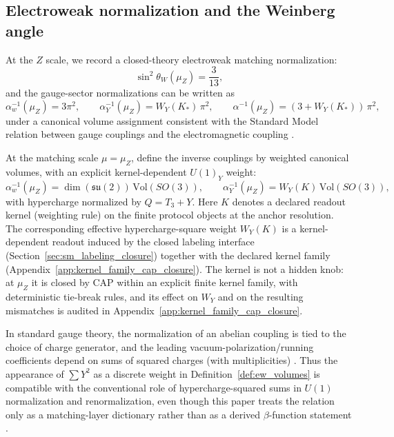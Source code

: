 \subsection{Electroweak normalization and the Weinberg angle}
\label{subsec:weinberg_angle}

At the $Z$ scale, we record a closed-theory electroweak matching normalization:
\begin{equation}\label{eq:weinberg_3_13}
\sin^2\theta_W(\mu_Z)=\frac{3}{13},
\end{equation}
and the gauge-sector normalizations can be written as
\begin{equation}\label{eq:ew_inverse_alphas}
\alpha_w^{-1}(\mu_Z)=3\pi^2,\qquad \alpha_Y^{-1}(\mu_Z)=W_Y(K_\ast)\,\pi^2,\qquad \alpha^{-1}(\mu_Z)=(3+W_Y(K_\ast))\,\pi^2,
\end{equation}
under a canonical volume assignment consistent with the Standard Model relation between gauge couplings and the electromagnetic coupling \cite{Glashow1961,Weinberg1967,Salam1968,PeskinSchroeder1995,PDGRPP2024}.
\begin{definition}\label{def:ew_volumes}
At the matching scale $\mu=\mu_Z$, define the inverse couplings by weighted canonical volumes, with an explicit kernel-dependent $U(1)_Y$ weight:
\[
\alpha_w^{-1}(\mu_Z)=\dim(\mathfrak{su}(2))\,\mathrm{Vol}(SO(3)),\qquad
\alpha_Y^{-1}(\mu_Z)=W_Y(K)\,\mathrm{Vol}(SO(3)),
\]
with hypercharge normalized by $Q=T_3+Y$.
\AuditTag Here $K$ denotes a declared readout kernel (weighting rule) on the finite protocol objects at the anchor resolution.
The corresponding effective hypercharge-square weight $W_Y(K)$ is a kernel-dependent readout induced by the closed labeling interface (Section~\ref{sec:sm_labeling_closure}) together with the declared kernel family (Appendix~\ref{app:kernel_family_cap_closure}).
\AuditTag The kernel is not a hidden knob: at $\mu_Z$ it is closed by CAP within an explicit finite kernel family, with deterministic tie-break rules, and its effect on $W_Y$ and on the resulting mismatches is audited in Appendix~\ref{app:kernel_family_cap_closure}.
\end{definition}

\begin{remark}\label{rem:why_sum_y2}
In standard gauge theory, the normalization of an abelian coupling is tied to the choice of charge generator, and the leading vacuum-polarization/running coefficients depend on sums of squared charges (with multiplicities) \cite{PeskinSchroeder1995,PDGRPP2024}.
Thus the appearance of $\sum Y^2$ as a discrete weight in Definition~\ref{def:ew_volumes} is compatible with the conventional role of hypercharge-squared sums in $U(1)$ normalization and renormalization, even though this paper treats the relation only as a matching-layer dictionary rather than as a derived $\beta$-function statement \cite{MartinRobertson2019TadpoleFreeMSbar}.
\end{remark}

